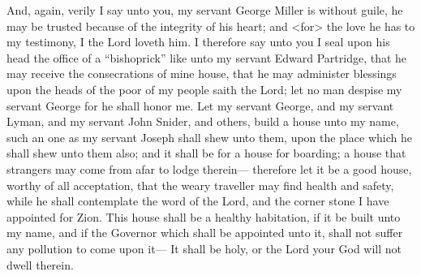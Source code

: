 				And, again, verily I say unto you, my servant George Miller is without guile, he may be trusted because of the integrity of his heart; and <for> the love he has to my testimony, I the Lord loveth him. I therefore say unto you I seal upon his head the office of a ``bishoprick'' like unto my servant Edward Partridge, that he may receive the consecrations of mine house, that he may administer blessings upon the heads of the poor of my people saith the Lord; let no man despise my servant George for he shall honor me. Let my servant George, and my servant Lyman, and my servant John Snider, and others, build a house unto my name, such an one as my servant Joseph shall shew unto them, upon the place which he shall shew unto them also; and it shall be for a house for boarding; a house that strangers may come from afar to lodge therein--- therefore let it be a good house, worthy of all acceptation, that the weary traveller may find health and safety, while he shall contemplate the word of the Lord, and the corner stone I have appointed for Zion. This house shall be a healthy habitation, if it be built unto my name, and if the Governor which shall be appointed unto it, shall not suffer any pollution to come upon it--- It shall be holy, or the Lord your God will not dwell therein.

